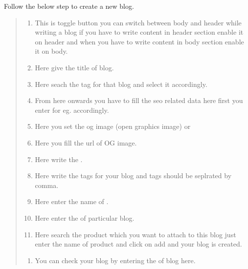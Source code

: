 \documentclass[a4paper,10pt,english]{report}
\begin{document}
Follow the below step to create a new blog.
\begin{quote}
\begin{enumerate}
\def\theenumi{\alph{enumi}}
\def\labelenumi{\theenumi .}
\makeatletter\def\p@enumii{\p@enumi \theenumi .}\makeatother
\item {} 
This is toggle button you can switch between body and header while writing a blog if you have to write content in header section enable it on header and when you have to write content in body section enable it on body.

\item {} 
Here give the title of blog.

\item {} 
Here seach the tag for that blog and select it accordingly.

\item {} 
From here onwards you have to fill the seo related data here first you enter  for eg.  accordingly.

\item {} 
Here you set the og image (open graphics image) or

\item {} 
Here you fill the url of OG image.

\item {} 
Here write the  .

\item {} 
Here write the tags for your blog and tags should be seplrated by comma.

\item {} 
Here enter the name of  .

\item {} 
Here enter the  of particular blog.

\item {} 
Here search the product which you want to attach to this blog just enter the name of product and click on add and your blog is created.

\end{enumerate}
\begin{enumerate}
\def\theenumi{\arabic{enumi}}
\def\labelenumi{\theenumi .}
\makeatletter\def\p@enumii{\p@enumi \theenumi .}\makeatother
\setcounter{enumi}{1}
\item {} 
You can check your blog by entering the  of blog here.


\end{enumerate}
\end{quote}
\end{document}
